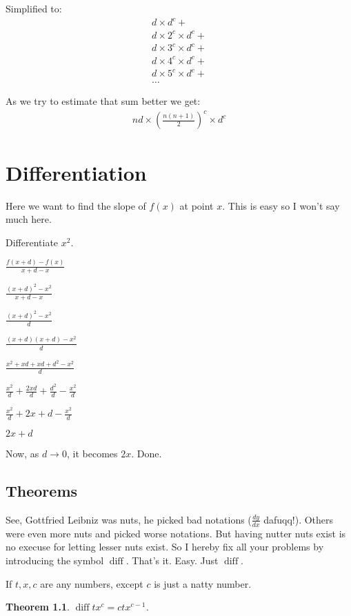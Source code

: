\documentclass{report}
\newtheorem{theorem}{Theorem}
\DeclareMathOperator{\diff}{diff}
\begin{document}
    Simplified to:
    \[\begin{split}
        d \times d^c + \\
        d \times 2^c \times d^c + \\
        d \times 3^c \times d^c + \\
        d \times 4^c \times d^c + \\
        d \times 5^c \times d^c + \\
        \ldots
    \end{split}\]

    As we try to estimate that sum better we get:
    \[\begin{split}
        nd \times (\frac{n(n+1)}{2})^c \times d^c
    \end{split}\]




\chapter{Differentiation}
Here we want to find the slope of $f(x)$ at point $x$. This is easy so I won't
say much here.

Differentiate $x^2$.

$\frac{f(x+d) - f(x)}{x + d - x}$

$\frac{(x+d)^2 - x^2}{x + d - x}$

$\frac{(x+d)^2 - x^2}{d}$

$\frac{(x+d)(x+d) - x^2}{d}$

$\frac{x^2 + xd + xd + d^2 - x^2}{d}$

$\frac{x^2}{d} + \frac{2xd}{d} + \frac{d^2}{d} - \frac{x^2}{d}$

$\frac{x^2}{d} + 2x + d - \frac{x^2}{d}$

$2x + d$

Now, as $d \rightarrow 0$, it becomes $2x$. Done.

\section{Theorems}
See, Gottfried Leibniz was nuts, he picked bad notations ($\frac{dy}{dx}$
dafuqq!).  Others were even more nuts and picked worse notations. But having
nutter nuts exist is no execuse for letting lesser nuts exist.  So I hereby fix
all your problems by introducing the symbol $\diff$. That's it.  Easy. Just
$\diff$.

If $t, x, c$ are any numbers, except $c$ is just a natty number.
\begin{theorem}
    $\diff tx^c = ctx^{c-1}$.
\end{theorem}
\end{document}
